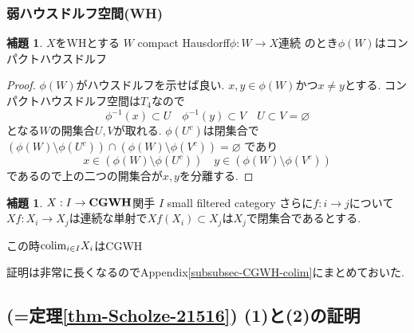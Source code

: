 \documentclass[dvipdfmx,a4paper,11pt]{article}
\newcommand{\colim}{{\rm colim}}
\theoremstyle{definition}
\newtheorem{lem}[thm]{補題}
\newcommand{\xr}[1]{\textcolor{red}{#1}}
\begin{document}
\subsubsection{弱ハウスドルフ空間(WH)}

\begin{tcolorbox}
 [colback = white, colframe = green!35!black, fonttitle = \bfseries,breakable = true]
\begin{lem}\cite[Lemma 1.3]{Str}
\label{lem-weakhaus}
$X$をWHとする 
$W$ compact Hausdorff$\phi : W \to X$連続
のとき$\phi(W)$はコンパクトハウスドルフ
\end{lem}
\end{tcolorbox}

\begin{proof}
$\phi(W)$がハウスドルフを示せば良い.
$x,y \in \phi(W)$かつ$x \neq y$とする.
コンパクトハウスドルフ空間は$T_4$なので
$$
\phi^{-1}(x) \subset U\quad
\phi^{-1}(y) \subset V\quad
U \subset V = \varnothing
$$
となる$W$の開集合$U,V$が取れる. 
$\phi(U^{c})$は閉集合で
$\left( \phi(W) \setminus \phi(U^c) \right) \cap \left( \phi(W) \setminus \phi(V^c) \right) = \varnothing$
であり
$$
x \in \left( \phi(W) \setminus \phi(U^c) \right) \quad
y \in \left( \phi(W) \setminus \phi(V^c) \right) 
$$
であるので上の二つの開集合が$x,y$を分離する.
\end{proof}



\begin{tcolorbox}
 [colback = white, colframe = green!35!black, fonttitle = \bfseries,breakable = true]

\begin{lem}\cite[Lemma 3.3]{Str}
\label{lem-weakhaus-2}
$X : I \to {\bf CGWH}$関手
$I$ small filtered category
さらに$f: i \to j$について$Xf : X_i \to X_j$は連続な単射で$Xf(X_i) \subset X_j$は$X_j$で閉集合であるとする. 

この時$\colim_{i \in I}X_i$はCGWH
\end{lem}
\end{tcolorbox}
証明は非常に長くなるのでAppendix\ref{subsubsec-CGWH-colim}にまとめておいた. 

\subsection{\cite[Proposition 2.15, Theorem 2.16]{Sch19}(=定理\ref{thm-Scholze-21516}) (1)と(2)の証明}
\end{document}
